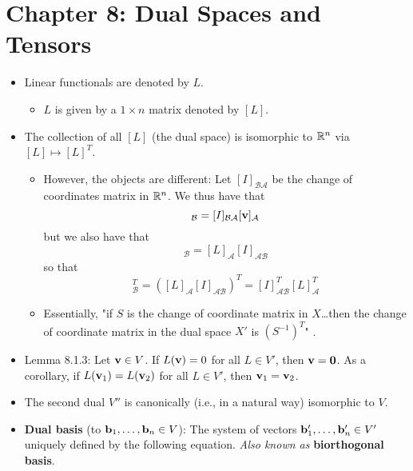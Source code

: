 \documentclass[../../notes.tex]{subfiles}
\begin{document}
\section{Chapter 8: Dual Spaces and Tensors}
\begin{itemize}
    \item {}Linear functionals are denoted by $L$.
    \begin{itemize}
        \item $L$ is given by a $1\times n$ matrix denoted by $[L]$.
    \end{itemize}
    \item The collection of all $[L]$ (the dual space) is isomorphic to $\mathbb{R}^n$ via $[L]\mapsto[L]^T$.
    \begin{itemize}
        \item However, the objects are different: Let $[I]_{\mathcal{B}\mathcal{A}}$ be the change of coordinates matrix in $\mathbb{R}^n$. We thus have that
        \begin{equation*}
            [\vm]_\mathcal{B} = [I]_{\mathcal{B}\mathcal{A}}[\vm]_\mathcal{A}
        \end{equation*}
        but we also have that
        \begin{equation*}
            [L]_\mathcal{B} = [L]_\mathcal{A}[I]_{\mathcal{A}\mathcal{B}}
        \end{equation*}
        so that
        \begin{equation*}
            [L]_\mathcal{B}^T = ([L]_\mathcal{A}[I]_{\mathcal{A}\mathcal{B}})^T
            = [I]_{\mathcal{A}\mathcal{B}}^T[L]_\mathcal{A}^T
        \end{equation*}
        \item Essentially, "if $S$ is the change of coordinate matrix in $X$\dots then the change of coordinate matrix in the dual space $X'$ is $(S^{-1})^T$" \parencite[219]{bib:Treil}.
    \end{itemize}
    \item Lemma 8.1.3: Let $\mathbf{v}\in V$. If $L(\mathbf{v})=0$ for all $L\in V'$, then $\mathbf{v}=\bm{0}$. As a corollary, if $L(\mathbf{v}_1)=L(\mathbf{v}_2)$ for all $L\in V'$, then $\mathbf{v}_1=\mathbf{v}_2$.
    \item The second dual $V''$ is canonically (i.e., in a natural way) isomorphic to $V$.
    \item \textbf{Dual basis} (to $\mathbf{b}_1,\dots,\mathbf{b}_n\in V$): The system of vectors $\mathbf{b}_1',\dots,\mathbf{b}_n'\in V'$ uniquely defined by the following equation. \emph{Also known as} \textbf{biorthogonal basis}.
    \begin{equation*}

\end{equation*}
\end{itemize}
\end{document}
